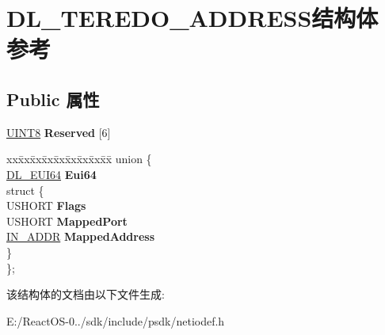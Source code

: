 \hypertarget{struct_d_l___t_e_r_e_d_o___a_d_d_r_e_s_s}{}\section{D\+L\+\_\+\+T\+E\+R\+E\+D\+O\+\_\+\+A\+D\+D\+R\+E\+S\+S结构体 参考}
\label{struct_d_l___t_e_r_e_d_o___a_d_d_r_e_s_s}
\subsection*{Public 属性}
\begin{DoxyCompactItemize}
\item 
\mbox{\label{struct_d_l___t_e_r_e_d_o___a_d_d_r_e_s_s_a9cb112295ea7d22edc73ce3af19367ff}} 
\hyperlink{_processor_bind_8h_ab27e9918b538ce9d8ca692479b375b6a}{U\+I\+N\+T8} {\bfseries Reserved} \mbox{[}6\mbox{]}
\item 
\mbox{\label{struct_d_l___t_e_r_e_d_o___a_d_d_r_e_s_s_aba3a2a6a7f09ede9351d7db38a5293a7}} 
\begin{tabbing}
xx\=xx\=xx\=xx\=xx\=xx\=xx\=xx\=xx\=\kill
union \{\\
\>\hyperlink{union___d_l___e_u_i64}{DL\_EUI64} {\bfseries Eui64}\\
\mbox{\label{union_d_l___t_e_r_e_d_o___a_d_d_r_e_s_s_1_1_0D2687_a6a2c30f12aeda9632b1b189864560177}} 
\>struct \{\\
\>\>USHORT {\bfseries Flags}\\
\>\>USHORT {\bfseries MappedPort}\\
\>\>\hyperlink{structin__addr}{IN\_ADDR} {\bfseries MappedAddress}\\
\>\} \\
\}; \\

\end{tabbing}\end{DoxyCompactItemize}


该结构体的文档由以下文件生成\+:\begin{DoxyCompactItemize}
\item 
E\+:/\+React\+O\+S-\/0../sdk/include/psdk/netiodef.\+h\end{DoxyCompactItemize}
